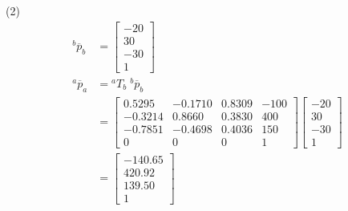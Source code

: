 \documentclass[UTF8, 13pt]{ctexart}
\begin{document}
(2)
\[
\begin{aligned}
    {}^b \overline{p}_b &=  \begin{bmatrix}
                    -20 \\ 30 \\ -30 \\ 1
                \end{bmatrix} \\
    {}^a \overline{p}_a &= {}^a T_b \; {}^b \overline{p}_b \\
            &=
            \begin{bmatrix}
                0.5295 & -0.1710 &  0.8309 & -100 \\
                -0.3214 &  0.8660 &  0.3830 & 400 \\
                -0.7851 & -0.4698 &  0.4036 & 150 \\
                0 & 0 & 0 & 1
            \end{bmatrix}
            \begin{bmatrix}
                -20 \\ 30 \\ -30 \\ 1
            \end{bmatrix} \\
            &=
            \begin{bmatrix}
                -140.65 \\ 420.92 \\ 139.50 \\ 1
            \end{bmatrix}
\end{aligned}
\]
\end{document}

